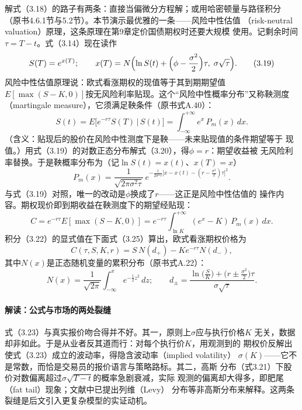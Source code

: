 解式（3.18）的路子有两条：直接当偏微分方程解；或用哈密顿量与路径积分
（原书4.6.1节与5.2节）。本节演示最优雅的一条——风险中性估值
（risk-neutral valuation）原理，这条原理在第9章定价国债期权时还要大规模
使用。记剩余时间$\tau=T-t$。式（3.14）现在读作
\begin{equation*}
S(T)=e^{x(T)};\qquad
x(T)=N\Bigl(\ln S(t)+\Bigl(\phi-\frac{\sigma^{2}}{2}\Bigr)\tau,\;
\sigma\sqrt{\tau}\Bigr).
\tag{3.19}
\end{equation*}
风险中性估值原理说：欧式看涨期权的现值等于其到期期望值
$E[\max(S-K,0)]$按无风险利率贴现。这个“风险中性概率分布”又称鞅测度
（martingale measure），它须满足鞅条件（原书式A.40）：
\begin{equation*}
S(t)=E\bigl[e^{-r\tau}S(T)\,\big|\,S(t)\bigr]
=\int_{-\infty}^{+\infty}e^{x}\,P_m(x)\,dx.
\tag{3.20}
\end{equation*}
（含义：贴现后的股价在风险中性测度下是鞅——未来贴现值的条件期望等于
现值。）用式（3.19）的对数正态分布解式（3.20），得$\phi=r$：期望收益被
无风险利率替换。于是鞅概率分布为（记$\ln S(t)=x(t)$、$x(T)=x$）
\begin{equation*}
P_m(x)=\frac{1}{\sqrt{2\pi\sigma^{2}\tau}}\,
e^{-\frac{1}{2\sigma^{2}\tau}\bigl[x-x(t)-(r-\frac{\sigma^{2}}{2})\tau\bigr]^{2}}.
\tag{3.21}
\end{equation*}
与式（3.19）对照，唯一的改动是$\phi$换成了$r$——这正是风险中性估值的
操作内容。期权现价即到期收益在鞅测度下的期望经贴现：
\begin{equation*}
C=e^{-r\tau}E[\max(S-K,0)]
=e^{-r\tau}\int_{\ln K}^{+\infty}(e^{x}-K)\,P_m(x)\,dx.
\tag{3.22}
\end{equation*}
积分（3.22）的显式值在下面式（3.25）算出，欧式看涨期权价格为
\begin{equation*}
C(\tau,S,K,r)=S\,N(d_{+})-Ke^{-r\tau}N(d_{-}),
\tag{3.23}
\end{equation*}
其中$N(x)$是正态随机变量的累积分布（原书式A.22）：
\begin{equation*}
N(x)=\frac{1}{\sqrt{2\pi}}\int_{-\infty}^{x}e^{-\frac{1}{2}z^{2}}\,dz;
\qquad
d_{\pm}=\frac{\ln\bigl(\frac{S}{K}\bigr)+\bigl(r\pm\frac{\sigma^{2}}{2}\bigr)\tau}
{\sigma\sqrt{\tau}}.
\tag{3.24}
\end{equation*}

\paragraph{解读：公式与市场的两处裂缝}
式（3.23）与真实报价吻合得并不好。其一，原则上$\sigma$应与执行价格$K$
无关，数据却非如此。于是从业者反其道而行：对每个执行价$K$，用观测到的
期权价反解出使式（3.23）成立的波动率，得隐含波动率（implied volatility）
$\sigma(K)$——它不是常数，而恰是交易员的报价语言与策略路标。其二，高斯
分布（式3.21）下股价对数偏离超过$\sigma\sqrt{T-t}$的概率急剧衰减，实际
观测的偏离却大得多，即肥尾（fat tail）现象；文献中已提出列维（Levy）
分布等非高斯分布来解释。这两条裂缝是后文引入更复杂模型的实证动机。

